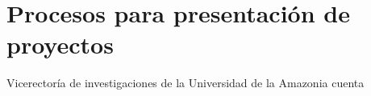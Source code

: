\chapter{Procesos para presentaci\'on de proyectos}

Vicerector\'ia de investigaciones de la Universidad de la
Amazonia cuenta 
